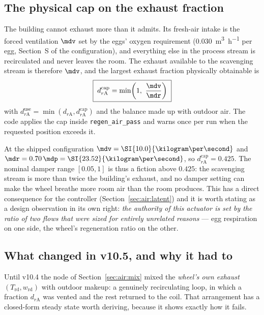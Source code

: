 \subsection{The physical cap on the exhaust fraction}
\label{sec:air:cap}

The building cannot exhaust more than it admits. Its fresh-air intake is the
forced ventilation $\mdv$ set by the eggs' oxygen requirement
(\SI{0.030}{\metre\cubed\per\hour} per egg, Section~S of the configuration),
and everything else in the process stream is recirculated and never leaves the
room. The exhaust available to the scavenging stream is therefore $\mdv$, and
the largest exhaust fraction physically obtainable is
\begin{equation}
\boxed{\;
d_{r\mathrm{A}}^{\mathrm{cap}} = \min\!\left(1,\ \frac{\mdv}{\mdr}\right)
\;}
\label{eq:air:cap}
\end{equation}
with $d_{r\mathrm{A}}^{\mathrm{use}} = \min(d_{r\mathrm{A}},
d_{r\mathrm{A}}^{\mathrm{cap}})$ and the balance made up with outdoor air. The
code applies the cap inside \texttt{regen\_air\_pass} and warns once per run
when the requested position exceeds it.

At the shipped configuration $\mdv=\SI{10.0}{\kilogram\per\second}$ and
$\mdr=0.70\,\mdp=\SI{23.52}{\kilogram\per\second}$, so
$d_{r\mathrm{A}}^{\mathrm{cap}}=\num{0.425}$. The nominal damper range
$[0.05,1]$ is thus a fiction above $0.425$: the scavenging stream is more than
twice the building's exhaust, and no damper setting can make the wheel breathe
more room air than the room produces. This has a direct consequence for the
controller (Section~\ref{sec:air:latent}) and it is worth stating as a design
observation in its own right: \emph{the authority of this actuator is set by
the ratio of two flows that were sized for entirely unrelated reasons} ---
egg respiration on one side, the wheel's regeneration ratio on the other.

\subsection{What changed in v10.5, and why it had to}
\label{sec:air:v105}

Until v10.4 the node of Section~\ref{sec:air:mix} mixed the \emph{wheel's own
exhaust} $(T_{\mathrm{rd}},w_{\mathrm{rd}})$ with outdoor makeup: a genuinely
recirculating loop, in which a fraction $d_{r\mathrm{A}}$ was vented and the
rest returned to the coil. That arrangement has a closed-form steady state
worth deriving, because it shows exactly how it fails.

